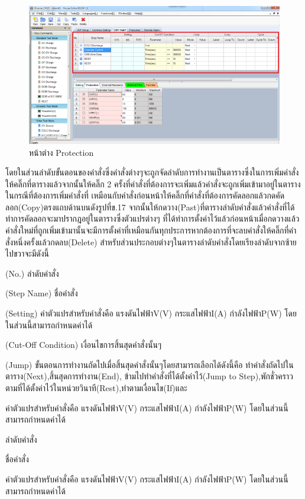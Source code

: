 \begin{center}
	\begin{figure}[H]
		\includegraphics[width=1\linewidth]{Chapters/img/17020_Program/Recipe_Editor/UUT_tesing_page.png}
		\centering
		\captionsetup{justification=centering,margin=2cm}
		\caption{หน้าต่าง Protection}
	\end{figure}
\end{center}
โดยในส่วนลำดับขั้นตอนของคำสั่งซึ่งคำสั่งต่างๆจะถูกจัดลำดับการทำงานเป็นตารางซึ่งในการเพิ่มคำสั่งให้คลิ๊กที่ตารางแล้วจากนั้นให้คลิ๊ก 2 ครั้งที่คำสั่งที่ต้องการจะเพิ่มแล้วคำสั่งจะถูกเพิ่มเข้ามาอยู่ในตารางในกรณีที่ต้องการเพิ่มคำสั่งที่
เหมือนกับคำสั่งก่อนหน้าให้คลิ๊กที่คำสั่งที่ต้องการคัดลอกแล้วกดคัดลอก(Copy)ตรงแถบด้านบนดังรูปที่ข.17 จากนั้นให้กดวาง(Past)ที่ตารางลำดับคำสั่งแล้วคำสั่งที่ได้ทำการคัดลอกจะมาปรากฎอยู่ในตารางซึ่งตัวแปรต่างๆ
ที่ได้ทำการตั้งค่าไว้แล้วก่อนหน้าเมื่อกดวางแล้วคำสั่งใหม่ที่ถูกเพิ่มเข้ามานั้นจะมีการตั้งค่าที่เหมือนกันทุกประการหากต้องการที่จะลบคำสั่งให้คลิ๊กที่คำสั่งหนึ่งครั้งแล้วกดลบ(Delete) 
\newline \hspace*{2cm}
สำหรับส่วนประกอบต่างๆในตารางลำดับคำสั่งโดยเรียงลำดับจากซ้ายไปขวาจะมีดังนี้
\begin{itemize}
{\item (No.) ลำดับคำสั่ง}
{\item (Step Name) ชื่อคำสั่ง}
{\item (Setting) ค่าตัวแปรสำหรับคำสั่งคือ แรงดันไฟฟ้าV(V) กระแสไฟฟ้าI(A) กำลังไฟฟ้าP(W) โดยในส่วนนี้สามารถกำหนดค่าได้}
{\item (Cut-Off Condition) เงื่อนไขการสิ้นสุดคำสั่งนั้นๆ}
{\item (Jump) ขั้นตอนการทำงานถัดไปเมื่อสิ้นสุดคำสั่งนั้นๆโดยสามารถเลือกได้ดังนี้คือ ทำคำสั่งถัดไปในตาราง(Next),\newline สิ้นสุดการทำงาน(End), 
ข้ามไปทำคำสั่งที่ได้ตั้งค่าไว้(Jump to Step),พักชั่วคราวตามที่ได้ตั้งค่าไว้ในหน่วยวินาที(Rest),ทำตามเงื่อนไข(If)และ}
{\item ค่าตัวแปรสำหรับคำสั่งคือ แรงดันไฟฟ้าV(V) กระแสไฟฟ้าI(A) กำลังไฟฟ้าP(W) โดยในส่วนนี้สามารถกำหนดค่าได้}
{\item ลำดับคำสั่ง}
{\item ชื่อคำสั่ง}
{\item ค่าตัวแปรสำหรับคำสั่งคือ แรงดันไฟฟ้าV(V) กระแสไฟฟ้าI(A) กำลังไฟฟ้าP(W) โดยในส่วนนี้สามารถกำหนดค่าได้}
\end{itemize}





